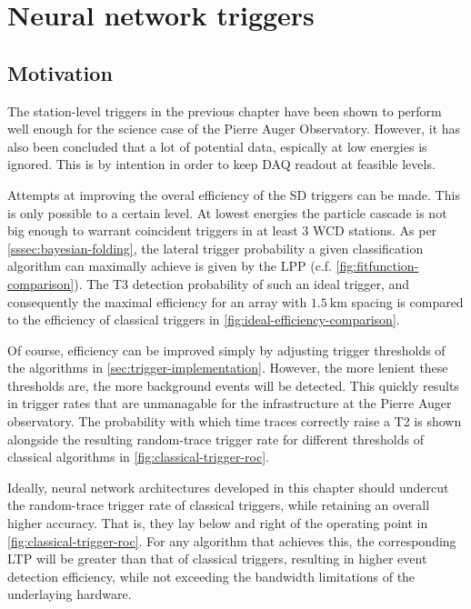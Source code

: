 
\chapter{Neural network triggers}
\label{chap:neural-network-triggers}

\section{Motivation}
\label{sec:motivation}

The station-level triggers in the previous chapter have been shown to perform well enough for the science case of the Pierre Auger Observatory. However, it has 
also been concluded that a lot of potential data, espically at low energies is ignored. This is by intention in order to keep DAQ readout at feasible levels.

Attempts at improving the overal efficiency of the SD triggers can be made. This is only possible to a certain level. At lowest energies the particle cascade is 
not big enough to warrant coincident triggers in at least 3 WCD stations. As per \autoref{sssec:bayesian-folding}, the lateral trigger probability a given 
classification algorithm can maximally achieve is given by the LPP (c.f. \autoref{fig:fitfunction-comparison}). The T3 detection probability of such an ideal 
trigger, and consequently the maximal efficiency for an array with $\SI{1.5}{\kilo\meter}$ spacing is compared to the efficiency of classical triggers in 
\autoref{fig:ideal-efficiency-comparison}.

Of course, efficiency can be improved simply by adjusting trigger thresholds of the algorithms in \autoref{sec:trigger-implementation}. However, the more lenient
these thresholds are, the more background events will be detected. This quickly results in trigger rates that are unmanagable for the infrastructure at the Pierre 
Auger observatory. The probability with which time traces correctly raise a T2 is shown alongside the resulting random-trace trigger rate for different thresholds
of classical algorithms in \autoref{fig:classical-trigger-roc}.

Ideally, neural network architectures developed in this chapter should undercut the random-trace trigger rate of classical triggers, while retaining an overall 
higher accuracy. That is, they lay below and right of the operating point in \autoref{fig:classical-trigger-roc}. For any algorithm that achieves this, the 
corresponding LTP will be greater than that of classical triggers, resulting in higher event detection efficiency, while not exceeding the bandwidth limitations 
of the underlaying hardware. 


